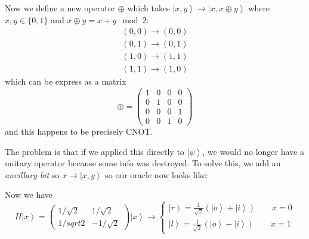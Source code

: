 \documentclass[12pt]{article}
\newcommand{\ket}[1]{\left\vert #1 \right\rangle}
\begin{document}
        Now we define a new operator $\oplus$ which takes $\ket{x, y} \to \ket{x, x \oplus y}$ where $x, y \in \{0, 1\}$ and $x \oplus y = x + y \mod 2$: 
        \begin{align*}
            (0, 0) \to (0, 0)\\ 
            (0, 1) \to (0, 1)\\ 
            (1, 0) \to (1, 1)\\ 
            (1, 1) \to (1, 0)
        \end{align*}
        which can be express as a matrix 
        \[\oplus = \begin{pmatrix}
            1 & 0 & 0 & 0\\ 
            0 & 1 & 0 & 0\\ 
            0 & 0 & 0 & 1\\ 
            0 & 0 & 1 & 0
        \end{pmatrix}\]
        and this happens to be precisely CNOT. 

        The problem is that if we applied this directly to $\ket{\psi}$, we would no longer have a unitary operator because some info was destroyed. To solve this, we add an \emph{ancillary bit} so $x \to \ket{x, y}$ so our oracle now looks like:
        \begin{center}
        \end{center}

        Now we have 
        \[H\ket{x} = \begin{pmatrix}
            1/\sqrt 2 & 1/\sqrt 2\\ 
            1/sqrt 2 & -1/\sqrt 2
        \end{pmatrix}\ket{x} \to \begin{cases}
            \ket{r} = \frac{1}{\sqrt 2}(\ket{o} + \ket{i}) \qquad x = 0\\ 
            \ket{l} = \frac{1}{\sqrt 2}(\ket{o} - \ket{i}) \qquad x = 1 
        \end{cases}\]
\end{document}
